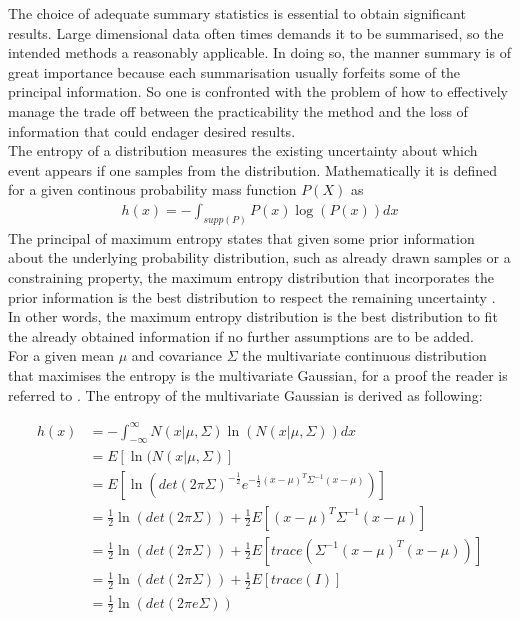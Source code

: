 \documentclass[a4paper, 11pt]{article}
\begin{document}
The choice of adequate summary statistics is essential to obtain significant results. Large dimensional data often times demands it to be summarised, so the intended methods a reasonably applicable. In doing so, the manner summary is of great importance because each summarisation usually forfeits some of the principal information. So one is confronted with the problem of how to effectively manage the trade off between the practicability the method and the loss of information that could endager desired results.\\
The entropy of a distribution measures the existing uncertainty about which event appears if one samples from the distribution. Mathematically it is defined for a given continous probability mass function $P(X)$ as
\begin{align*}
h(x) = - \int_{supp(P)}P(x)\log(P(x))dx
\end{align*}
The principal of maximum entropy states that given some prior information about the underlying probability distribution, such as already drawn samples or a constraining property, the maximum entropy distribution that incorporates the prior information is the best distribution to respect the remaining uncertainty \cite{jaynes1957information}. In other words, the maximum entropy distribution is the best distribution to fit the already obtained information if no further assumptions are to be added. \\
For a given mean $\mu$ and covariance $\Sigma$ the multivariate continuous distribution that maximises the entropy is the multivariate Gaussian, for a proof the reader is referred to \cite{cover2012elements}.
The entropy of the multivariate Gaussian is derived as following:

\begin{align*}
h(x) & = - \int_{-\infty}^{\infty} N(x|\mu, \Sigma)\ln(N(x|\mu, \Sigma))dx \\
& = E[\ln(N(x|\mu, \Sigma)] \\
& = E[\ln(det(2\pi\Sigma)^{-\frac{1}{2}}e^{-\frac{1}{2}(x-\mu)^T\Sigma^{-1}(x-\mu)})] \\
& = \frac{1}{2}\ln(det(2\pi\Sigma)) + \frac{1}{2} E[(x-\mu)^T \Sigma^{-1}(x-\mu)]\\
& = \frac{1}{2} \ln(det(2\pi\Sigma)) + \frac{1}{2} E[trace(\Sigma^{-1}(x-\mu)^T (x-\mu))]\\
& = \frac{1}{2} \ln(det(2\pi\Sigma)) + \frac{1}{2} E[trace(I)]\\
& = \frac{1}{2} \ln(det(2\pi e \Sigma))
\end{align*}
\end{document}
